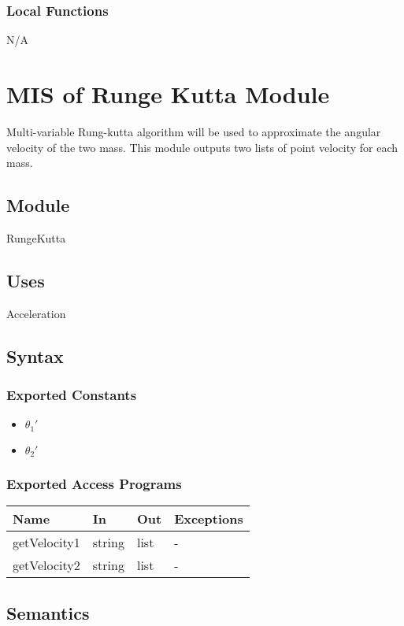 \documentclass[12pt, titlepage]{article}
\begin{document}
\subsubsection{Local Functions}

N/A
\newpage
\section{MIS of Runge Kutta Module} \label{RKModule} 
Multi-variable Rung-kutta algorithm will be used to approximate the angular velocity of the two mass. \cite{RungeKutta} This module outputs two lists of point velocity for each mass. 
\subsection{Module}
RungeKutta
\subsection{Uses}
Acceleration

\subsection{Syntax}

\subsubsection{Exported Constants}
\begin{itemize}
  \item ${\theta_1}'$
  \item ${\theta_2}'$
\end{itemize}
\subsubsection{Exported Access Programs}

\begin{center}
\begin{tabular}{p{2cm} p{4cm} p{4cm} p{2cm}}
\hline
\textbf{Name} & \textbf{In} & \textbf{Out} & \textbf{Exceptions} \\
\hline
getVelocity1 & string & list & - \\
\hline
getVelocity2 & string & list & - \\
\hline
\end{tabular}
\end{center}

\subsection{Semantics}
\end{document}
